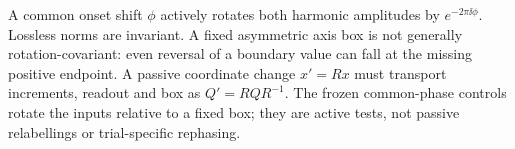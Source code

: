 A common onset shift $\phi$ actively rotates both harmonic amplitudes by $e^{-2\pi\ii\phi}$. Lossless norms are invariant. A fixed asymmetric axis box is not generally rotation-covariant: even reversal of a boundary value can fall at the missing positive endpoint. A passive coordinate change $x'=Rx$ must transport increments, readout and box as $Q'=RQR^{-1}$. The frozen common-phase controls rotate the inputs relative to a fixed box; they are active tests, not passive relabellings or trial-specific rephasing.

